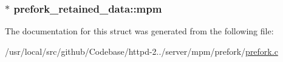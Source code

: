 \subsubsection[{\texorpdfstring{mpm}{mpm}}]{$\ast$ prefork\+\_\+retained\+\_\+data\+::mpm}\hypertarget{structprefork__retained__data_ace750e67197f447ee3febfc90e0a0355}{}\label{structprefork__retained__data_ace750e67197f447ee3febfc90e0a0355}


The documentation for this struct was generated from the following file\+:\begin{DoxyCompactItemize}
\item 
/usr/local/src/github/\+Codebase/httpd-\/2../server/mpm/prefork/\hyperlink{prefork_8c}{prefork.\+c}\end{DoxyCompactItemize}
